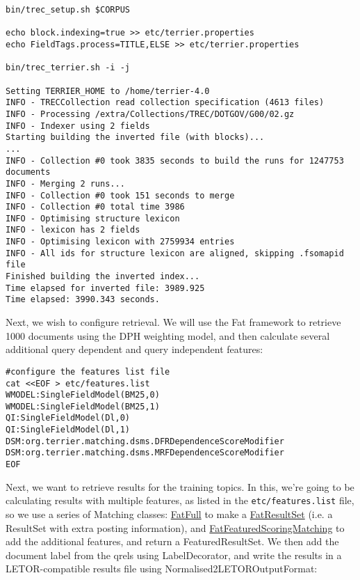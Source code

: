 \begin{verbatim}
bin/trec_setup.sh $CORPUS

echo block.indexing=true >> etc/terrier.properties
echo FieldTags.process=TITLE,ELSE >> etc/terrier.properties

bin/trec_terrier.sh -i -j

Setting TERRIER_HOME to /home/terrier-4.0
INFO - TRECCollection read collection specification (4613 files)
INFO - Processing /extra/Collections/TREC/DOTGOV/G00/02.gz
INFO - Indexer using 2 fields
Starting building the inverted file (with blocks)...
...
INFO - Collection #0 took 3835 seconds to build the runs for 1247753 documents
INFO - Merging 2 runs...
INFO - Collection #0 took 151 seconds to merge
INFO - Collection #0 total time 3986
INFO - Optimising structure lexicon
INFO - lexicon has 2 fields
INFO - Optimising lexicon with 2759934 entries
INFO - All ids for structure lexicon are aligned, skipping .fsomapid file
Finished building the inverted index...
Time elapsed for inverted file: 3989.925
Time elapsed: 3990.343 seconds.
\end{verbatim}

Next, we wish to configure retrieval. We will use the Fat framework to
retrieve 1000 documents using the DPH weighting model, and then
calculate several additional query dependent and query independent
features:

\begin{verbatim}
#configure the features list file
cat <<EOF > etc/features.list
WMODEL:SingleFieldModel(BM25,0)
WMODEL:SingleFieldModel(BM25,1)
QI:SingleFieldModel(Dl,0)
QI:SingleFieldModel(Dl,1)
DSM:org.terrier.matching.dsms.DFRDependenceScoreModifier
DSM:org.terrier.matching.dsms.MRFDependenceScoreModifier
EOF
\end{verbatim}

Next, we want to retrieve results for the training topics. In this,
we're going to be calculating results with multiple features, as listed
in the \texttt{etc/features.list} file, so we use a series of Matching
classes: \href{javadoc/org/terrier/matching/daat/FatFull.html}{FatFull}
to make a
\href{javadoc/org/terrier/matching/FatResultSet.html}{FatResultSet}
(i.e. a ResultSet with extra posting information), and
\href{javadoc/org/terrier/matching/FatFeaturedScoringMatching.html}{FatFeaturedScoringMatching}
to add the additional features, and return a FeaturedResultSet. We then
add the document label from the qrels using LabelDecorator, and write
the results in a LETOR-compatible results file using
Normalised2LETOROutputFormat:

